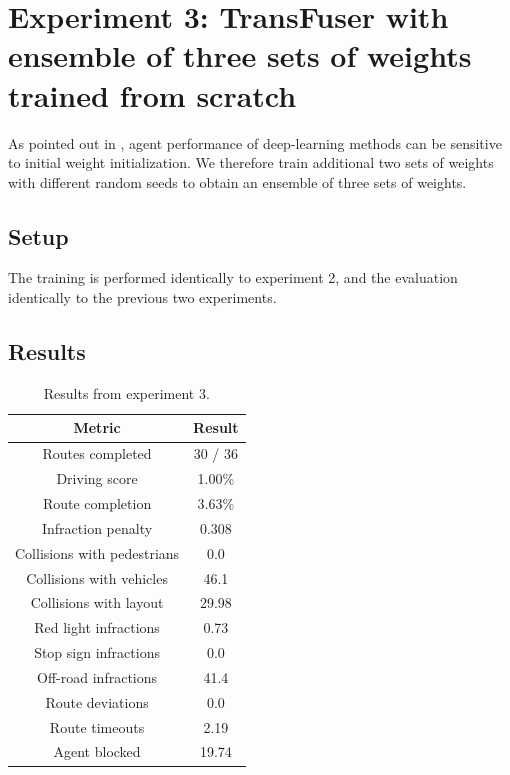 \section{Experiment 3: TransFuser with ensemble of three sets of weights trained from scratch}
\label{sec:exp3}
As pointed out in \cite{transfuser-pami},
agent performance of deep-learning methods can be sensitive to initial weight initialization.
We therefore train additional two sets of weights with different random seeds to obtain an ensemble of three sets of weights.

\subsection{Setup}
The training is performed identically to experiment 2,
and the evaluation identically to the previous two experiments.


\subsection{Results}

\begin{table}[]
    \centering
    \begin{tabular}{|c|c|}
        \hline
        \textbf{Metric} & \textbf{Result} \\ \hline
        Routes completed & 30 / 36 \\ \hline
        Driving score & 1.00\% \\ \hline
        Route completion & 3.63\% \\ \hline
        Infraction penalty & 0.308 \\ \hline
        Collisions with pedestrians & 0.0 \\ \hline
        Collisions with vehicles & 46.1 \\ \hline
        Collisions with layout & 29.98 \\ \hline
        Red light infractions & 0.73 \\ \hline
        Stop sign infractions & 0.0 \\ \hline
        Off-road infractions & 41.4 \\ \hline
        Route deviations & 0.0 \\ \hline
        Route timeouts & 2.19 \\ \hline
        Agent blocked & 19.74 \\ \hline
    \end{tabular}
    \caption{Results from experiment 3.}
    \label{tab:exp3:results}
\end{table}

